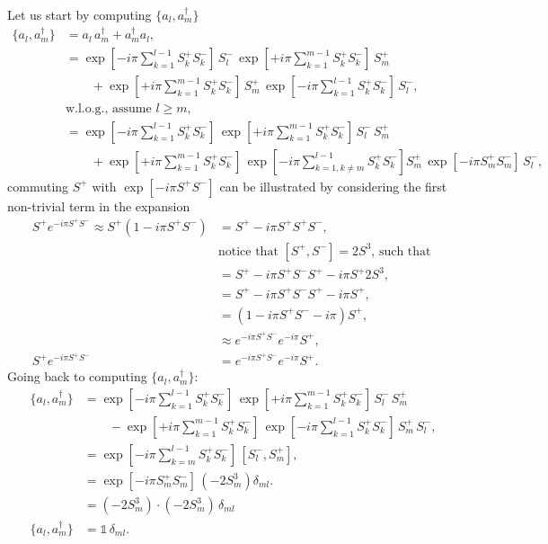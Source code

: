 \documentclass[a4paper]{report}
\begin{document}
\begin{spacing}{1.1}
\begin{appendices}
Let us start by computing $\{a_l,a_m^\dagger\}$
\begin{align*}
    \{a_l,a_m^\dagger\} &= a_l\,a_m^\dagger + a_m^\dagger a_l,\\
        &= \exp[-i\pi \sum_{k=1}^{l-1} S_k^+S_k^-] \, S_l^-\,\exp[+i\pi \sum_{k=1}^{m-1} S_k^+S_k^-] \, S_m^+ \\
        &\qquad + \exp[+i\pi \sum_{k=1}^{m-1} S_k^+S_k^-] \, S_m^+\,\exp[-i\pi \sum_{k=1}^{l-1} S_k^+S_k^-] \, S_l^-, \\
        &\text{w.l.o.g., assume $l\geq m$,} \\
        &= \exp[-i\pi \sum_{k=1}^{l-1} S_k^+S_k^-] \, \exp[+i\pi \sum_{k=1}^{m-1} S_k^+S_k^-] \, S_l^-\, S_m^+ \\ 
        &\qquad + \exp[+i\pi \sum_{k=1}^{m-1} S_k^+S_k^-] \,\exp[-i\pi \sum_{k=1, k  \neq m}^{l-1} S_k^+S_k^-] S_m^+\, \exp[-i \pi S_m^+ S_m^-] \, S_l^-, 
\end{align*}
commuting $S^+$ with $\exp[-i\pi S^+ S^-]$ can be illustrated by considering the first non-trivial term in the expansion
\begin{align*}
    S^+ e^{-i \pi S^+ S^-} \approx S^+ \left( 1-i \pi S^+ S^- \right) &= S^+ - i \pi S^+ S^+ S^-,\\
    &\text{notice that $\left[S^+,S^-\right] = 2S^3$, such that }\\
    &= S^+ - i \pi S^+ S^- S^+ - i\pi S^+ 2S^3,\\
    &= S^+ - i \pi S^+ S^- S^+ - i\pi S^+,\\
    &= \left(1-i\pi S^+ S^- - i\pi\right)S^+,\\
    &\approx e^{-i\pi S^+ S^-}e^{-i\pi} S^+,\\
    S^+ e^{-i \pi S^+ S^-} &= e^{-i\pi S^+ S^-}e^{-i\pi} S^+.
\end{align*}
Going back to computing $\{a_l,a_m^\dagger\}$:
\begin{align*}
    \{a_l,a_m^\dagger\} &= \exp[-i\pi \sum_{k=1}^{l-1} S_k^+S_k^-] \, \exp[+i\pi \sum_{k=1}^{m-1} S_k^+S_k^-] \, S_l^-\, S_m^+ \\ 
        &\qquad - \exp[+i\pi \sum_{k=1}^{m-1} S_k^+S_k^-] \,\exp[-i\pi \sum_{k=1}^{l-1} S_k^+S_k^-]\, S_m^+ \, S_l^-,\\
    &= \exp[-i\pi \sum_{k=m}^{l-1} S_k^+ S_k^- ]\,\left[ S_l^-,S_m^+ \right],\\
    &= \exp[-i\pi S_m^+ S_m^- ] \,(-2S_m^3) \delta_{ml}.\\
    &= (-2S_m^3)\cdot(-2S_m^3)\,\delta_{ml}\\
    \{a_l,a_m^\dagger\} &= \mathds{1}\,\delta_{ml}.

\end{align*}
\end{appendices}
\end{spacing}
\end{document}

